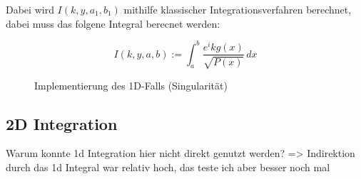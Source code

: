 Dabei wird $I(k,y,a_1, b_1)$ mithilfe klassischer Integrationsverfahren berechnet, dabei muss das folgene Integral berecnet werden:

\begin{equation}
    I(k,y,a,b) := \int_{a}^{b}  \frac{e^ikg(x)}{\sqrt{P(x)}} \,dx 
\end{equation}

\begin{figure}
    
    \caption{Implementierung des 1D-Falls (Singularität)}
\end{figure}


\subsection{2D Integration}

Warum konnte 1d Integration hier nicht direkt genutzt werden?
=> Indirektion durch das 1d Integral war relativ hoch, das teste ich aber besser noch mal